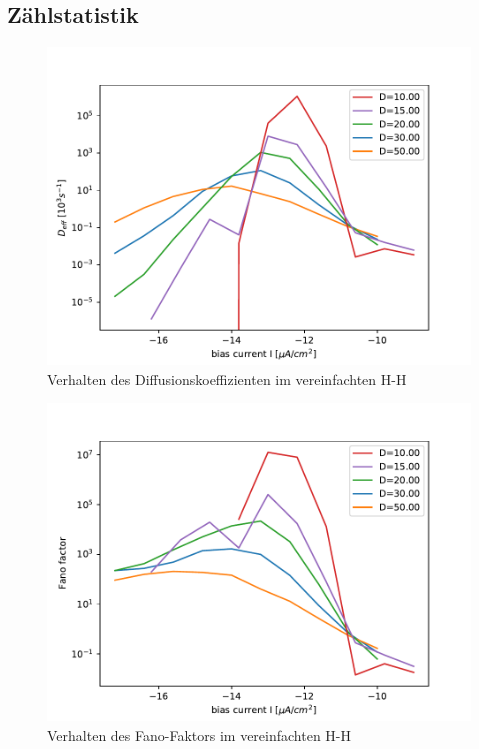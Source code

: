 \documentclass[12pt,a4paper]{article}
\begin{document}
\subsection{Zählstatistik}
\begin{figure}[H]
	\centering
	\includegraphics[scale=1]{drinzel.pdf}\caption{Verhalten des Diffusionskoeffizienten im vereinfachten H-H}
	\label{drinzel}
\end{figure}
\begin{figure}[H]
	\centering
	\includegraphics[scale=1]{frinzel.pdf}\caption{Verhalten des Fano-Faktors im vereinfachten H-H}
	\label{frinzel}
\end{figure}
\end{document}
